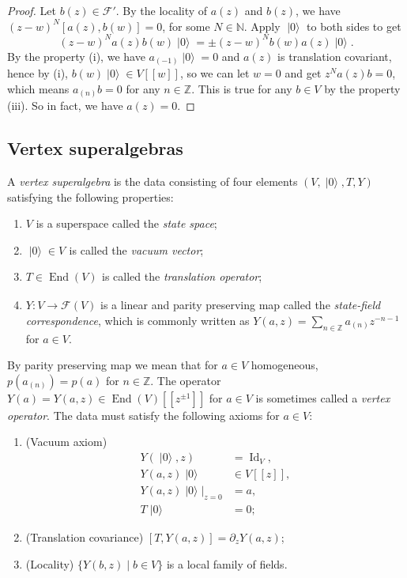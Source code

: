 \documentclass[a4paper, 12pt, reqno]{amsart}
\theoremstyle{remark}
\DeclareMathOperator{\Id}{Id}
\DeclareMathOperator{\End}{End}
\DeclareMathOperator{\vac}{|0\rangle}
\DeclareMathOperator{\zero}{\overline{0}}
\begin{document}
\begin{proof}
  Let $b(z) \in \mathcal{F}'$.
  By the locality of $a(z)$ and $b(z)$, we have $(z - w)^N[a(z), b(w)] = 0$, for some $N \in \mathbb{N}$.
  Apply $\vac$ to both sides to get
  \begin{equation*}
    (z - w)^Na(z)b(w)\vac = \pm(z - w)^Nb(w)a(z)\vac.
  \end{equation*}
  By the property (i), we have $a_{(-1)}\vac = 0$ and $a(z)$ is translation covariant, hence by (i), $b(w)\vac \in V[[w]]$, so we can let $w = 0$ and get $z^Na(z)b = 0$, which means $a_{(n)}b = 0$ for any $n \in \mathbb{Z}$.
  This is true for any $b \in V$ by the property (iii).
  So in fact, we have $a(z) = 0$.
\end{proof}

\subsection{Vertex superalgebras}
\label{sec:vertex-superalgebras}

A \emph{vertex superalgebra} is the data consisting of four elements $(V, \vac, T, Y)$ satisfying the following properties:
\begin{enumerate}
\item $V$ is a superspace called the \emph{state space};
\item $\vac \in V_{\zero}$ is called the \emph{vacuum vector};
\item $T \in \End(V)_{\zero}$ is called the \emph{translation operator};
\item $Y: V \to \mathcal{F}(V)$ is a linear and parity preserving map called the \emph{state-field correspondence}, which is commonly written as $Y(a, z) = \sum_{n \in \mathbb{Z}}a_{(n)}z^{-n - 1}$ for $a \in V$.
\end{enumerate}
By parity preserving map we mean that for $a \in V$ homogeneous, $p(a_{(n)}) = p(a)$ for $n \in \mathbb{Z}$.
The operator $Y(a) = Y(a, z) \in \End(V)[[z^{\pm 1}]]$ for $a \in V$ is sometimes called a \emph{vertex operator}.
The data must satisfy the following axioms for $a \in V$:
\begin{enumerate}
\item (Vacuum axiom)
  \begin{align*}
    Y(\vac,z) &= \Id_V, \\
    Y(a, z)\vac &\in V[[z]], \\
    Y(a, z)\vac|_{z = 0} &= a, \\
    T\vac &= 0;
  \end{align*}
\item (Translation covariance) $[T, Y(a, z)] = \partial_zY(a, z)$;
\item (Locality) $\{Y(b, z) \mid b \in V\}$ is a local family of fields.
\end{enumerate}
\end{document}
